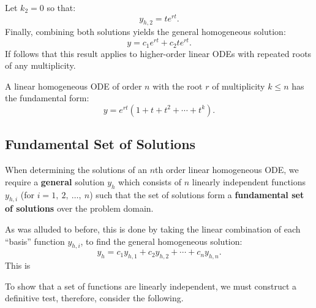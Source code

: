 \documentclass{article}
\begin{document}
Let \(k_2 = 0\) so that:
\begin{equation*}
    y_{h,2} = t e^{rt}.
\end{equation*}
Finally, combining both solutions yields the general homogeneous solution:
\begin{equation*}
    y = c_1 e^{rt} + c_2 t e^{rt}.
\end{equation*}
If follows that this result applies to higher-order linear ODEs with repeated roots of any multiplicity.
\begin{proposition}
    A linear homogeneous ODE of order \(n\) with the root \(r\) of multiplicity \(k \leq n\) has the fundamental form:
    \begin{equation*}
        y = e^{r t} \left( 1 + t + t^2 + \cdots + t^k \right).
    \end{equation*}
\end{proposition}
\subsection{Fundamental Set of Solutions}
When determining the solutions of an \(n\)th order linear homogeneous ODE, we require a \textbf{general} solution \(y_h\) which
consists of \(n\) linearly independent functions \(y_{h,i}\) (for \(i = 1,\: 2,\: \dots,\: n\)) such that the set of solutions
form a \textbf{fundamental set of solutions} over the problem domain.

As was alluded to before, this is done by taking the linear combination of each ``basis'' function \(y_{h,i}\),
to find the general homogeneous solution:
\begin{equation*}
    y_h = c_1 y_{h,1} + c_2 y_{h,2} + \cdots + c_n y_{h,n}.
\end{equation*}
This is

To show that a set of functions are linearly independent, we must construct a definitive test, therefore,
consider the following.
\end{document}
